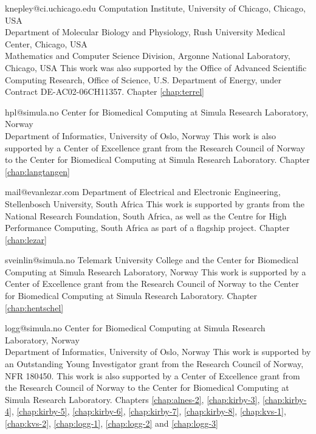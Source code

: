              {knepley@ci.uchicago.edu}
             {Computation Institute, University of Chicago, Chicago, USA \\
              Department of Molecular Biology and Physiology, Rush University Medical Center, Chicago, USA \\
              Mathematics and Computer Science Division, Argonne National Laboratory, Chicago, USA}
             {This work was also supported by the Office of Advanced Scientific Computing
              Research, Office of Science, U.S. Department of Energy, under Contract DE-AC02-06CH11357.}
             {Chapter \ref{chap:terrel}}

             {hpl@simula.no}
             {Center for Biomedical Computing at Simula Research Laboratory, Norway \\
              Department of Informatics, University of Oslo, Norway}
             {This work is also supported by a Center of Excellence
              grant from the Research Council of Norway to the Center
              for Biomedical Computing at Simula Research
              Laboratory.}
             {Chapter \ref{chap:langtangen}}

             {mail@evanlezar.com}
             {Department of Electrical and Electronic Engineering, Stellenbosch University, South Africa}
             {This work is supported by grants from the National Research
              Foundation, South Africa, as well as the Centre for High Performance
              Computing, South Africa as part of a flagship project.}
             {Chapter \ref{chap:lezar}}

             {sveinlin@simula.no}
             {Telemark University College and the Center for Biomedical Computing at Simula Research Laboratory, Norway}
             {This work is supported by a Center of Excellence
              grant from the Research Council of Norway to the Center
              for Biomedical Computing at Simula Research
              Laboratory.}
             {Chapter \ref{chap:hentschel}}

             {logg@simula.no}
             {Center for Biomedical Computing at Simula Research Laboratory, Norway \\
              Department of Informatics, University of Oslo, Norway}
             {This work is supported by an Outstanding Young
              Investigator grant from the Research Council of Norway,
              NFR 180450. This work is also supported by a Center of
              Excellence grant from the Research Council of Norway to
              the Center for Biomedical Computing at Simula Research
              Laboratory.}
             {Chapters
              \ref{chap:alnes-2}, \ref{chap:kirby-3}, \ref{chap:kirby-4},
              \ref{chap:kirby-5}, \ref{chap:kirby-6}, \ref{chap:kirby-7},
              \ref{chap:kirby-8}, \ref{chap:kvs-1}, \ref{chap:kvs-2},
              \ref{chap:logg-1}, \ref{chap:logg-2} and \ref{chap:logg-3}}

